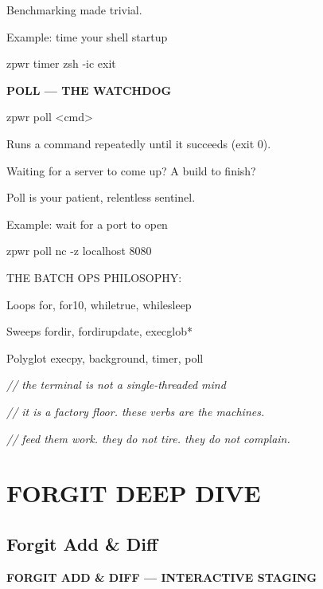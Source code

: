 \documentclass[11pt,a4paper,twoside]{book}
\begin{document}
Benchmarking made trivial.

Example: time your shell startup

\begin{codebox}
zpwr timer zsh -ic exit\\
\end{codebox}


\vspace{12pt}
{\bfseries\color{neonyellow} POLL — THE WATCHDOG}\vspace{4pt}

\begin{codebox}
zpwr poll <cmd>\\
\end{codebox}

Runs a command repeatedly until it succeeds (exit 0).

Waiting for a server to come up? A build to finish?

Poll is your patient, relentless sentinel.

Example: wait for a port to open

\begin{codebox}
zpwr poll nc -z localhost 8080\\
\end{codebox}

THE BATCH OPS PHILOSOPHY:

Loops        for, for10, whiletrue, whilesleep

Sweeps       fordir, fordirupdate, execglob*

Polyglot     execpy, background, timer, poll

{\small\itshape\color{dimtext} // the terminal is not a single-threaded mind}

{\small\itshape\color{dimtext} // it is a factory floor. these verbs are the machines.}

{\small\itshape\color{dimtext} // feed them work. they do not tire. they do not complain.}


\vspace{16pt}


\chapter{FORGIT DEEP DIVE}

\section{Forgit Add \& Diff}


\vspace{10pt}
{\large\bfseries\color{neoncyan} FORGIT ADD \& DIFF — INTERACTIVE STAGING}\vspace{6pt}
\end{document}
